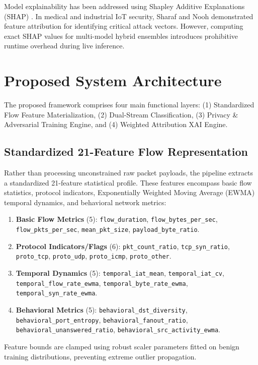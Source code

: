 \documentclass[10pt,journal,compsoc,twocolumn]{IEEEtran}
\begin{document}
Model explainability has been addressed using Shapley Additive Explanations (SHAP) \cite{lundberg2017unified}. In medical and industrial IoT security, Sharaf and Nooh \cite{sharaf2024identifying} demonstrated feature attribution for identifying critical attack vectors. However, computing exact SHAP values for multi-model hybrid ensembles introduces prohibitive runtime overhead during live inference.

\section{Proposed System Architecture}
The proposed framework comprises four main functional layers: (1) Standardized Flow Feature Materialization, (2) Dual-Stream Classification, (3) Privacy \& Adversarial Training Engine, and (4) Weighted Attribution XAI Engine.

\subsection{Standardized 21-Feature Flow Representation}
Rather than processing unconstrained raw packet payloads, the pipeline extracts a standardized 21-feature statistical profile. These features encompass basic flow statistics, protocol indicators, Exponentially Weighted Moving Average (EWMA) temporal dynamics, and behavioral network metrics:

\begin{enumerate}
    \item \textbf{Basic Flow Metrics} (5): \texttt{flow\_duration}, \texttt{flow\_bytes\_per\_sec}, \texttt{flow\_pkts\_per\_sec}, \texttt{mean\_pkt\_size}, \texttt{payload\_byte\_ratio}.
    \item \textbf{Protocol Indicators/Flags} (6): \texttt{pkt\_count\_ratio}, \texttt{tcp\_syn\_ratio}, \texttt{proto\_tcp}, \texttt{proto\_udp}, \texttt{proto\_icmp}, \texttt{proto\_other}.
    \item \textbf{Temporal Dynamics} (5): \texttt{temporal\_iat\_mean}, \texttt{temporal\_iat\_cv}, \texttt{temporal\_flow\_rate\_ewma}, \texttt{temporal\_byte\_rate\_ewma}, \texttt{temporal\_syn\_rate\_ewma}.
    \item \textbf{Behavioral Metrics} (5): \texttt{behavioral\_dst\_diversity}, \texttt{behavioral\_port\_entropy}, \texttt{behavioral\_fanout\_ratio}, \texttt{behavioral\_unanswered\_ratio}, \texttt{behavioral\_src\_activity\_ewma}.
\end{enumerate}

Feature bounds are clamped using robust scaler parameters fitted on benign training distributions, preventing extreme outlier propagation.
\end{document}
